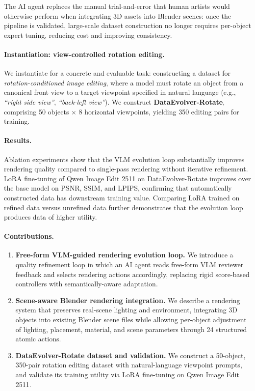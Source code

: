 The AI agent replaces the manual trial-and-error that human artists would otherwise perform
when integrating 3D assets into Blender scenes:
once the pipeline is validated, large-scale dataset construction no longer requires
per-object expert tuning, reducing cost and improving consistency.

\paragraph{Instantiation: view-controlled rotation editing.}
We instantiate \dataevolver{} for a concrete and evaluable task:
constructing a dataset for \emph{rotation-conditioned image editing},
where a model must rotate an object from a canonical front view to a target viewpoint
specified in natural language (e.g., \textit{``right side view''}, \textit{``back-left view''}).
We construct \textbf{DataEvolver-Rotate}, comprising 50 objects $\times$ 8 horizontal viewpoints,
yielding 350 editing pairs for training.

\paragraph{Results.}
Ablation experiments show that the VLM evolution loop substantially
improves rendering quality compared to single-pass rendering without iterative refinement.
LoRA fine-tuning of Qwen Image Edit 2511 on DataEvolver-Rotate improves over the base model
on PSNR, SSIM, and LPIPS, confirming that automatically constructed data
has downstream training value.
Comparing LoRA trained on refined data versus unrefined data further demonstrates
that the evolution loop produces data of higher utility.

\paragraph{Contributions.}
\begin{enumerate}
  \item \textbf{Free-form VLM-guided rendering evolution loop.}
    We introduce a quality refinement loop in which an AI agent reads
    free-form VLM reviewer feedback and selects rendering actions accordingly,
    replacing rigid score-based controllers with semantically-aware adaptation.

  \item \textbf{Scene-aware Blender rendering integration.}
    We describe a rendering system that preserves real-scene lighting and environment,
    integrating 3D objects into existing Blender scene files while allowing
    per-object adjustment of lighting, placement, material, and scene parameters
    through 24 structured atomic actions.

  \item \textbf{DataEvolver-Rotate dataset and validation.}
    We construct a 50-object, 350-pair rotation editing dataset with
    natural-language viewpoint prompts, and validate its training utility
    via LoRA fine-tuning on Qwen Image Edit 2511.
\end{enumerate}
